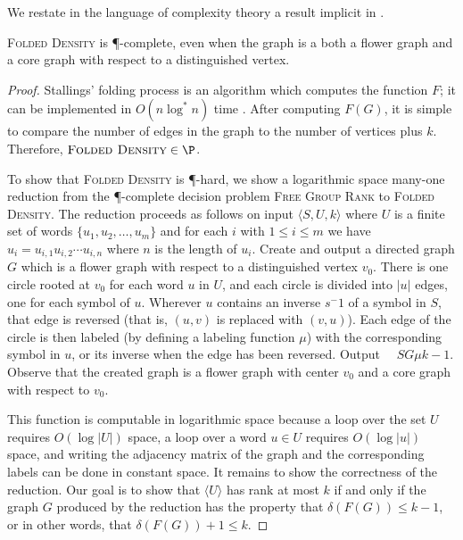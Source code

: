 \documentclass{article}
\newcommand{\FGR}{\textsc{Free Group Rank}}
\newcommand{\FD}{\textsc{Folded Density}}
\newcommand{\triple}[3]{\langle #1, #2, #3 \rangle}
\newcommand{\gen}[1]{\langle #1 \rangle}
\begin{document}
We restate in the language of complexity theory a result implicit in \cite{km02}.
\begin{theorem}
  \FD{} is \P-complete, even when the graph is a both a flower graph and a core graph with respect to a distinguished vertex.
\end{theorem}
\begin{proof}
  Stallings' folding process \cite[Algorithm~5.4]{stallings83} is an algorithm which computes the function $F$; it can be implemented in $O(n \log^* n)$ time \cite{touikan06}.
  After computing $F(G)$, it is simple to compare the number of edges in the graph to the number of vertices plus $k$.
  Therefore, $\FD \in \P$.

  To show that \FD{} is \P-hard, we show a logarithmic space many-one reduction from the \P-complete decision problem \FGR{} to \FD.
  The reduction proceeds as follows on input $\triple{S}{U}{k}$ where $U$ is a finite set of words $\{u_1, u_2, \dotsc, u_m\}$ and for each $i$ with $1 \leq i \leq m$ we have $u_i = u_{i, 1}u_{i, 2}\dotsb u_{i, n}$ where $n$ is the length of $u_i$.
  Create and output a directed graph $G$ which is a flower graph with respect to a distinguished vertex $v_0$.
  There is one circle rooted at $v_0$ for each word $u$ in $U$, and each circle is divided into $|u|$ edges, one for each symbol of $u$.
  Wherever $u$ contains an inverse $s^-1$ of a symbol in $S$, that edge is reversed (that is, $(u, v)$ is replaced with $(v, u)$).
  Each edge of the circle is then labeled (by defining a labeling function $\mu$) with the corresponding symbol in $u$, or its inverse when the edge has been reversed.
  Output $\quad{S}{G}{\mu}{k - 1}$.
  Observe that the created graph is a flower graph with center $v_0$ and a core graph with respect to $v_0$.

  This function is computable in logarithmic space because a loop over the set $U$ requires $O(\log |U|)$ space, a loop over a word $u \in U$ requires $O(\log |u|)$ space, and writing the adjacency matrix of the graph and the corresponding labels can be done in constant space.
  It remains to show the correctness of the reduction.
  Our goal is to show that $\gen{U}$ has rank at most $k$ if and only if the graph $G$ produced by the reduction has the property that $\delta(F(G)) \leq k - 1$, or in other words, that $\delta(F(G)) + 1 \leq k$.


\end{proof}
\end{document}
